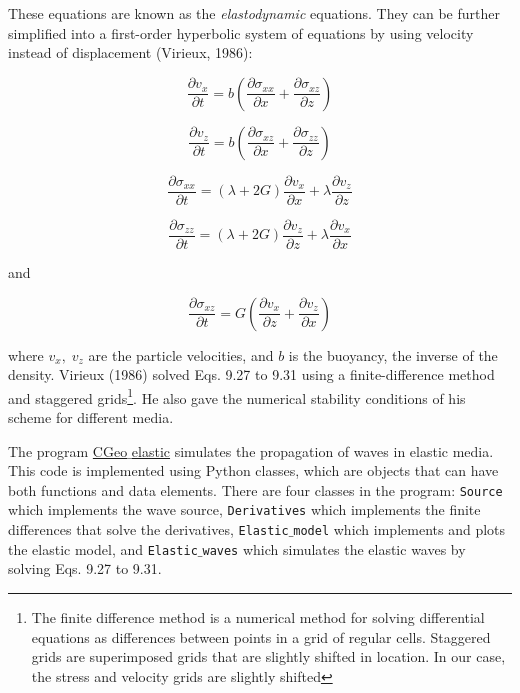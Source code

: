 \documentclass[a4paper , 12pt]{book}
\newcommand{\code}[1]{\colorbox{light-gray}{\texttt{#1}}}
\begin{document}
These equations are known as the \textit{elastodynamic} equations. They can be further simplified into a first-order hyperbolic system of equations by using velocity instead of displacement (Virieux, 1986):

\begin{equation}
    \frac{\partial v_x}{\partial t}=b\left(\frac{\partial \sigma_{xx}}{\partial x}+\frac{\partial\sigma_{xz}}{\partial z}\right) 
\end{equation}

\begin{equation}
    \frac{\partial v_z}{\partial t}=b\left(\frac{\partial \sigma_{xz}}{\partial x}+\frac{\partial\sigma_{zz}}{\partial z}\right)
\end{equation}

\begin{equation}
    \frac{\partial\sigma_{xx}}{\partial t}=\left(\lambda+2G\right)\frac{\partial v_x}{\partial x}+\lambda\frac{\partial v_z}{\partial z}
\end{equation}

\begin{equation}
    \frac{\partial\sigma_{zz}}{\partial t}=\left(\lambda+2G\right)\frac{\partial v_z}{\partial z}+\lambda\frac{\partial v_x}{\partial x}
\end{equation}

and

\begin{equation}
   \frac{\partial\sigma_{xz}}{\partial t}=G\left(\frac{\partial v_x}{\partial z}+\frac{\partial v_z}{\partial x}\right)  
\end{equation}

where $v_x, \; v_z$ are the particle velocities, and $b$ is the buoyancy, the inverse of the density. Virieux (1986) solved Eqs. 9.27 to 9.31 using a finite-difference method and staggered grids\footnote{The finite difference method is a numerical method for solving differential equations as differences between points in a grid of regular cells. Staggered grids are superimposed grids that are slightly shifted in location. In our case, the stress and velocity grids are slightly shifted}. He also gave the numerical stability conditions of his scheme for different media.

The program \href{https://github.com/nfcd/compGeo/blob/master/source/functions/CGeo_elastic.py}{CGeo$\_$elastic} simulates the propagation of waves in elastic media. This code is implemented using Python classes, which are objects that can have both functions and data elements. There are four classes in the program: \code{Source} which implements the wave source, \code{Derivatives} which implements the finite differences that solve the derivatives, \code{Elastic$\_$model} which implements and plots the elastic model, and \code{Elastic$\_$waves} which simulates the elastic waves by solving Eqs. 9.27 to 9.31.
\end{document}
